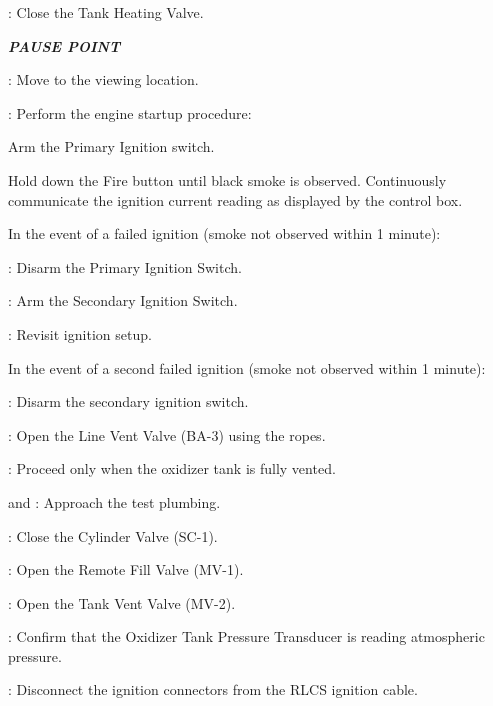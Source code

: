 \begin{checklist}
\begin{checklist}[label=$\bullet$]
\begin{checklist}
    		\end{checklist}
    	\end{checklist}
    	\item \control{}: Close the Tank Heating Valve. 
    	\item \textbf{\textit{PAUSE POINT}}
    	\item \perii{}: Move to the viewing location. 
    	\item \control{}: Perform the engine startup procedure:
    	\begin{checklist}
    		\item Arm the Primary Ignition switch.
    		\item Hold down the Fire button until black smoke is observed. Continuously communicate the ignition current reading as displayed by the control box. 
    		\begin{checklist}[label=$\bullet$]
    			\item In the event of a failed ignition (smoke not observed within 1 minute):
    			\begin{checklist}
    				\item \control{}: Disarm the Primary Ignition Switch.
    				\item \control{}: Arm the Secondary Ignition Switch.
    				\item \ops{}: Revisit ignition setup.
    			\end{checklist}
    			\item In the event of a second failed ignition (smoke not observed within 1 minute):
    			\begin{checklist}
    				\item \control{}: Disarm the secondary ignition switch.
    				\item \primary{}: Open the Line Vent Valve (BA-3) using the ropes. 
    				\item \ops{}: Proceed only when the oxidizer tank is fully vented. 
    				\item \primary{} and \secondary{}: Approach the test plumbing. 
    				\item \primary{}: Close the Cylinder Valve (SC-1). 
    				\item \control{}: Open the Remote Fill Valve (MV-1). 
    				\item \control{}: Open the Tank Vent Valve (MV-2). 
    				\item \daq{}: Confirm that the Oxidizer Tank Pressure Transducer is reading atmospheric pressure. 
    				\item \secondary{}: Disconnect the ignition connectors from the RLCS ignition cable. 

\end{checklist}
\end{checklist}
\end{checklist}
\end{checklist}
